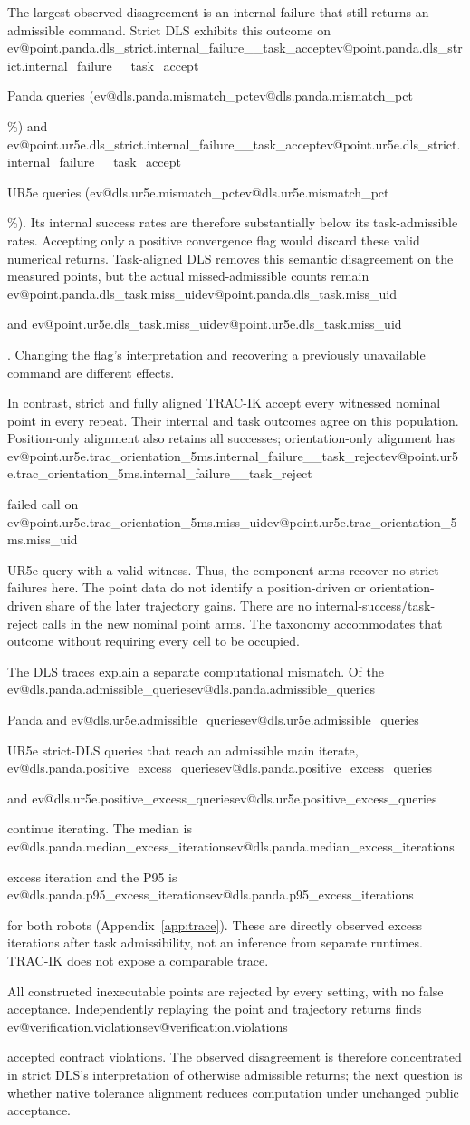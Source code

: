 \documentclass[10pt,a4paper]{article}
\makeatletter
\newcommand{\ev}[1]{\ifcsname ev@#1\endcsname\csname ev@#1\endcsname\else\PackageError{evidence}{Undefined evidence key #1}{}\fi}
\makeatother
\begin{document}
The largest observed disagreement is an internal failure that still returns an
admissible command. Strict DLS exhibits this outcome on
\ev{point.panda.dls_strict.internal_failure__task_accept} Panda queries
(\ev{dls.panda.mismatch_pct}\%) and
\ev{point.ur5e.dls_strict.internal_failure__task_accept} UR5e queries
(\ev{dls.ur5e.mismatch_pct}\%). Its internal success rates are therefore substantially
below its task-admissible rates. Accepting only a positive convergence flag would
discard these valid numerical returns. Task-aligned DLS removes this semantic
disagreement on the measured points, but the actual missed-admissible counts remain
\ev{point.panda.dls_task.miss_uid} and \ev{point.ur5e.dls_task.miss_uid}.
Changing the flag's interpretation and recovering a previously unavailable command
are different effects.

In contrast, strict and fully aligned TRAC-IK accept every witnessed nominal point
in every repeat. Their internal and task outcomes agree on this population.
Position-only alignment also retains all successes; orientation-only alignment has
\ev{point.ur5e.trac_orientation_5ms.internal_failure__task_reject} failed call on
\ev{point.ur5e.trac_orientation_5ms.miss_uid} UR5e query with a valid witness.
Thus, the component arms
recover no strict failures here. The point data do not identify a position-driven
or orientation-driven share of the later trajectory gains.
There are no internal-success/task-reject calls in the new nominal point arms.
The taxonomy accommodates that outcome without requiring every cell to be occupied.

The DLS traces explain a separate computational mismatch.
Of the \ev{dls.panda.admissible_queries} Panda and
\ev{dls.ur5e.admissible_queries} UR5e strict-DLS queries that reach an admissible
main iterate, \ev{dls.panda.positive_excess_queries} and
\ev{dls.ur5e.positive_excess_queries} continue iterating.
The median is \ev{dls.panda.median_excess_iterations} excess iteration and the
P95 is \ev{dls.panda.p95_excess_iterations} for both robots
(Appendix~\ref{app:trace}). These are directly observed excess iterations after
task admissibility, not an inference from separate runtimes.
TRAC-IK does not expose a comparable trace.

All constructed inexecutable points are rejected by every setting, with no false
acceptance. Independently replaying the point and trajectory returns finds
\ev{verification.violations} accepted contract violations.
The observed disagreement is therefore concentrated in strict DLS's interpretation
of otherwise admissible returns; the next question is whether native tolerance
alignment reduces computation under unchanged public acceptance.
\end{document}
